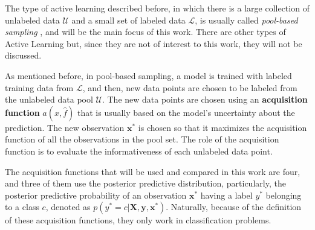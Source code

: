 
The type of active learning described before, in which there is a large collection of unlabeled data $\mathcal{U}$ and a small set of labeled data $\mathcal{L}$, is usually called \textit{pool-based sampling} \cite{settles.tr09}, and will be the main focus of this work. There are other types of Active Learning but, since they are not of interest to this work, they will not be discussed.

As mentioned before, in pool-based sampling, a model is trained with labeled training data from $\mathcal{L}$, and then, new data points are chosen to be labeled from the unlabeled data pool $\mathcal{U}$. The new data points are chosen using an \textbf{acquisition function} $a(x, \hat{f})$ that is usually based on the model's uncertainty about the prediction. The new observation $\boldsymbol{x}^*$ is chosen so that it maximizes the acquisition function of all the observations in the pool set. The role of the acquisition function is to evaluate the informativeness of each unlabeled data point.

The acquisition functions that will be used and compared in this work are four, and three of them use the posterior predictive distribution, particularly, the posterior predictive probability of an observation $\boldsymbol{x}^*$ having a label $y^*$ belonging to a class $c$, denoted as $p(y^* = c | \boldsymbol{X}, \boldsymbol{y}, \boldsymbol{x}^*)$. Naturally, because of the definition of these acquisition functions, they only work in classification problems.

